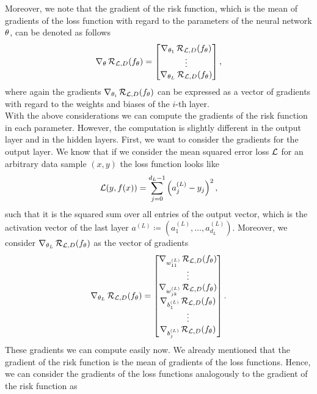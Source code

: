 Moreover, we note that the gradient of the risk function, which is the mean of gradients of the loss function with regard to the parameters of the neural network $\theta$, can be denoted as follows
\begin{align*}
\nabla_\theta \operatorname{\mathcal{R}}_{\operatorname{\mathcal{L}}, D} (f_{\theta}) = \left[ \begin{matrix}
\nabla_{\theta_{1}} \operatorname{\mathcal{R}}_{\operatorname{\mathcal{L}}, D} (f_{\theta})\\
\vdots\\
\nabla_{\theta_{L}} \operatorname{\mathcal{R}}_{\operatorname{\mathcal{L}}, D} (f_{\theta})\\
\end{matrix}\right],
\end{align*}
where again the gradients $\nabla_{\theta_{i}} \operatorname{\mathcal{R}}_{\operatorname{\mathcal{L}}, D} (f_{\theta})$ can be expressed as a vector of gradients with regard to the weights and biases of the $i$-th layer.\\
With the above considerations we can compute the gradients of the risk function in each parameter. However, the computation is slightly different in the output layer and in the hidden layers. First, we want to consider the gradients for the output layer. We know that if we consider the mean squared error loss $\operatorname{\mathcal{L}}$ for an arbitrary data sample $(x,y)$ the loss function looks like
\begin{align}\label{eq:nn_loss}
\operatorname{\mathcal{L}}(y, f(x)) = \sum_{j=0}^{d_L-1} \left(a_{j}^{(L)} - y_j \right)^2,
\end{align}
such that it is the squared sum over all entries of the output vector, which is the activation vector of the last layer $a^{(L)} \coloneqq (a^{(L)}_1, \ldots, a^{(L)}_{d_L})$.
Moreover, we consider $\nabla_{\theta_{L}} \operatorname{\mathcal{R}}_{\operatorname{\mathcal{L}}, D} (f_{\theta})$ as the vector of gradients
\begin{align*}
\nabla_{\theta_{L}} \operatorname{\mathcal{R}}_{\operatorname{\mathcal{L}}, D} (f_{\theta}) = \left[\begin{matrix}
\nabla_{w^{(L)}_{11}} \operatorname{\mathcal{R}}_{\operatorname{\mathcal{L}}, D} (f_{\theta})\\
\vdots\\
\nabla_{w^{(L)}_{jk}} \operatorname{\mathcal{R}}_{\operatorname{\mathcal{L}}, D} (f_{\theta})\\
\nabla_{b^{(L)}_{1}} \operatorname{\mathcal{R}}_{\operatorname{\mathcal{L}}, D} (f_{\theta})\\
\vdots\\
\nabla_{b^{(L)}_{j}} \operatorname{\mathcal{R}}_{\operatorname{\mathcal{L}}, D} (f_{\theta})
\end{matrix} \right].
\end{align*}
These gradients we can compute easily now. We already mentioned that the gradient of the risk function is the mean of gradients of the loss functions. Hence, we can consider the gradients of the loss functions analogously to the gradient of the risk function as
